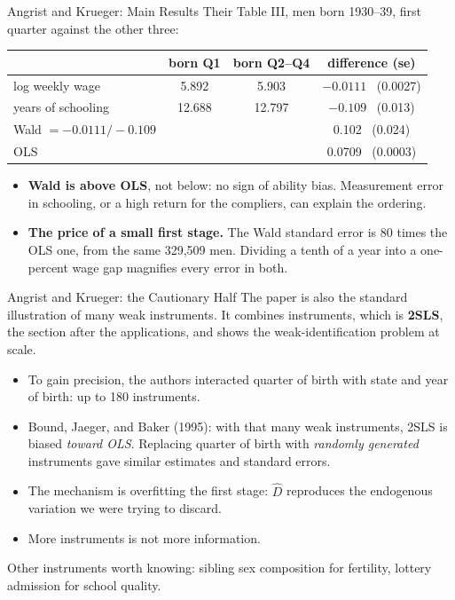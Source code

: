 \documentclass[aspectratio=169,11pt,xcolor=dvipsnames]{beamer}
\newcommand{\srct}[1]{#1}
\begin{document}
\begin{frame}{Angrist and Krueger: Main Results}
Their Table III, men born 1930--39, first quarter against the other three:
\begin{center}\small
\renewcommand{\arraystretch}{1.1}
\begin{tabular}{@{}lccc@{}}
\toprule
 & born Q1 & born Q2--Q4 & difference (se) \\
\midrule
log weekly wage & 5.892 & 5.903 & $-0.0111$ \ (0.0027) \\
years of schooling & 12.688 & 12.797 & $-0.109$ \ (0.013) \\
\midrule
Wald $= -0.0111 / -0.109$ & & & 0.102 \ (0.024) \\
OLS & & & 0.0709 \ (0.0003) \\
\bottomrule
\end{tabular}
\end{center}
\vskip2pt
\begin{itemize}\itemsep2pt
  \item \textbf{Wald is above OLS}, not below: no sign of ability bias.
        Measurement error in schooling, or a high return for the compliers,
        can explain the ordering.
  \item \textbf{The price of a small first stage.} The Wald standard error is
        80 times the OLS one, from the same 329,509 men. Dividing a tenth of a
        year into a one-percent wage gap magnifies every error in both.
\end{itemize}
\end{frame}

\begin{frame}{Angrist and Krueger: the Cautionary Half}
The paper is also the standard illustration of many weak instruments. It
combines instruments, which is \textbf{2SLS}, the section after the
applications, and shows the weak-identification problem at scale.
\vskip2pt
\begin{itemize}\itemsep2pt
  \item To gain precision, the authors interacted quarter of birth with state
        and year of birth: up to 180 instruments.
  \item \srct{Bound, Jaeger, and Baker (1995)}: with that many weak
        instruments, 2SLS is biased \emph{toward OLS}. Replacing quarter of
        birth with \emph{randomly generated} instruments gave similar
        estimates and standard errors.
  \item The mechanism is overfitting the first stage: $\hat D$ reproduces
        the endogenous variation we were trying to discard.
  \item \alert{More instruments is not more information.}
\end{itemize}
Other instruments worth knowing: sibling sex composition for fertility,
lottery admission for school quality.
\end{frame}
\end{document}
